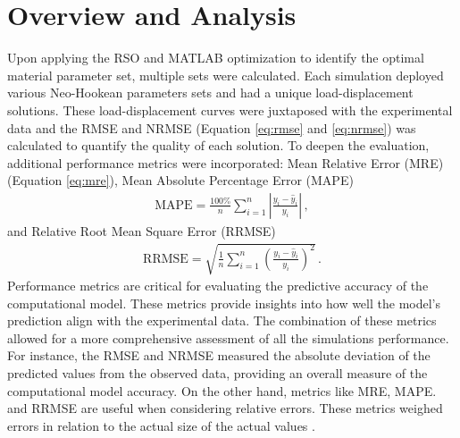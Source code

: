 \section{Overview and Analysis}
Upon applying the RSO and MATLAB optimization to identify the optimal material parameter set, 
multiple sets were calculated. 
Each simulation deployed various Neo-Hookean parameters sets and 
had a unique load-displacement solutions. These load-displacement curves were 
juxtaposed with the experimental data and the RMSE and NRMSE (Equation \ref{eq:rmse} and \ref{eq:nrmse}) was calculated to quantify the quality 
of each solution. To deepen the evaluation, additional performance metrics were incorporated: 
Mean Relative Error (MRE) (Equation \ref{eq:mre}), Mean Absolute Percentage Error (MAPE)
\begin{align}
    \text{MAPE} = \frac{100\%}{n} \sum_{i=1}^{n} \left| \frac{y_i - \hat{y}_i}{y_i} \right| \,,
\end{align}
and  Relative Root Mean Square Error (RRMSE)  
\begin{align}
    \text{RRMSE} = \sqrt{\frac{1}{n} \sum_{i=1}^{n} \left( \frac{y_i - \hat{y}_i}{y_i} \right)^2} \,.
\end{align}
Performance metrics are critical for evaluating the predictive accuracy of the computational model.
These metrics provide insights into how well the model's prediction align with the 
experimental data. The combination of these metrics allowed for a more comprehensive 
assessment of all the simulations performance. For instance, the RMSE and NRMSE measured the
absolute deviation of the predicted values from the observed data, providing an overall 
measure of the computational model accuracy. On the other hand, metrics like MRE, MAPE. and 
RRMSE are useful when considering relative errors. These metrics weighed errors in relation
to the actual size of the actual values \cite{Rajagukguk2020}.\\

